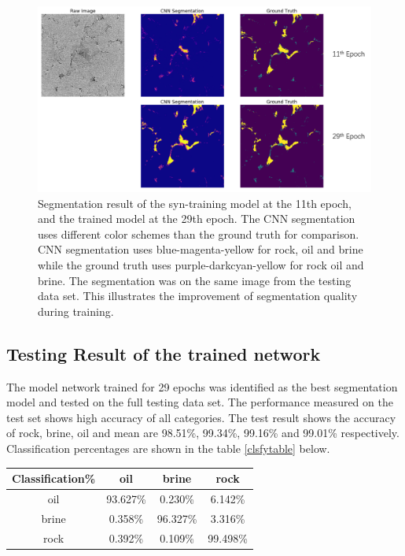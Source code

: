 \documentclass[draft,linenumbers]{agujournal2018}
\begin{document}
 \begin{figure}[h]
 \centering
 \includegraphics[width=33pc]{imgs/11-29.png}
 \caption{Segmentation result of the syn-training model at the 11th epoch, and the trained model at the 29th epoch. The CNN segmentation uses different color schemes than the ground truth for comparison. CNN segmentation uses blue-magenta-yellow for rock, oil and brine while the ground truth uses purple-darkcyan-yellow for rock oil and brine. The segmentation was on the same image from the testing data set. This illustrates the improvement of segmentation quality during training.}
 \label{1129}
 \end{figure}
 
\subsection{Testing Result of the trained network}
The model network trained for 29 epochs was identified as the best segmentation model and tested on the full testing data set. The performance measured on the test set shows high accuracy of all categories. The test result shows the accuracy of rock, brine, oil and mean are 98.51\%, 99.34\%, 99.16\% and 99.01\% respectively. Classification percentages are shown in the table \ref{clsfytable} below. 

\begin{landscape}\label{clsfytable}
\begin{table}[]
\centering
\begin{tabular}{|c|c|c|c|}
\hline
\multicolumn{1}{|r|}{Classification\%} & oil & brine & rock \\ \hline
oil & 93.627\% & 0.230\% & 6.142\% \\ \hline
brine & 0.358\% & 96.327\% & 3.316\% \\ \hline
rock & 0.392\% & 0.109\% & 99.498\% \\ \hline
\end{tabular}
\end{table}
\end{landscape}
\end{document}
